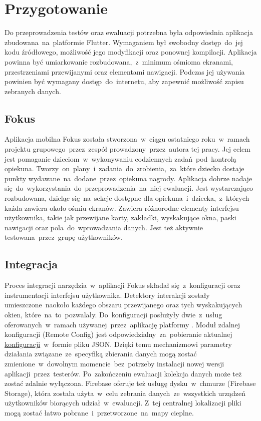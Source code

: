 \section{Przygotowanie}
Do przeprowadzenia testów oraz ewaluacji potrzebna była odpowiednia aplikacja zbudowana~na~platformie Flutter. Wymaganiem był swobodny dostęp~do~jej kodu źródłowego, możliwość jego modyfikacji oraz ponownej kompilacji. Aplikacja powinna być umiarkowanie rozbudowana,~z~minimum ośmioma ekranami, przestrzeniami przewijanymi oraz elementami nawigacji. Podczas jej używania powinien być wymagany dostęp~do~internetu, aby zapewnić możliwość zapisu zebranych danych. 

\subsection{Fokus}
Aplikacja mobilna Fokus została stworzona~w~ciągu ostatniego roku~w~ramach projektu grupowego~przez~zespół prowadzony~przez~autora tej pracy. Jej celem jest pomaganie dzieciom~w~wykonywaniu codziennych zadań~pod~kontrolą opiekuna. Tworzy~on~plany~i~zadania~do~zrobienia,~za~które dziecko dostaje punkty wydawane~na~dodane~przez~opiekuna nagrody. Aplikacja dobrze nadaje się~do~wykorzystania~do~przeprowadzenia~na~niej ewaluacji. Jest wystarczająco rozbudowana, dzieląc się~na~sekcje dostępne dla opiekuna~i~dziecka,~z~których każda zawiera około ośmiu ekranów. Zawiera różnorodne elementy interfejsu użytkownika, takie jak przewijane karty, zakładki, wyskakujące okna, paski nawigacji oraz pola~do~wprowadzania danych. Jest też aktywnie testowana~przez~grupę użytkowników.

\subsection{Integracja}
Proces integracji narzędzia~w~aplikacji Fokus składał się~z~konfiguracji oraz instrumentacji interfejsu użytkownika. Detektory interakcji zostały umieszczone~naokoło każdego obszaru przewijanego oraz tych wyskakujących okien, które~na~to~pozwalały. Do~konfiguracji posłużyły dwie~z~usług oferowanych~w~ramach używanej~przez~aplikację platformy . Moduł zdalnej konfiguracji (Remote Config) jest odpowiedzialny~za~pobieranie aktualnej \hyperref[sec:rs_config]{konfiguracji}~w~formie pliku JSON. Dzięki temu mechanizmowi parametry działania związane~ze~specyfiką zbierania danych mogą zostać zmienione~w~dowolnym momencie~bez~potrzeby instalacji nowej wersji aplikacji~przez~testerów. Po~zakończeniu ewaluacji kolekcja danych może też zostać zdalnie wyłączona. Firebase oferuje też usługę dysku~w~chmurze (Firebase Storage), która została użyta~w~celu zebrania danych~ze~wszystkich urządzeń użytkowników biorących udział~w~ewaluacji. Z~tej centralnej lokalizacji pliki mogą zostać łatwo pobrane~i~przetworzone~na~mapy cieplne.
